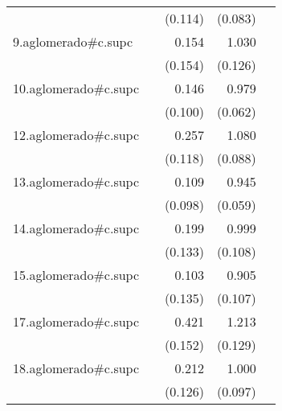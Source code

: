 {\begin{longtable}{l*{4}{D{.}{.}{-1}}}
            &                     &     (0.114)         &     (0.083)         &                     \\
\addlinespace
9.aglomerado#c.supc&                     &       0.154         &       1.030\sym{***}&                     \\
            &                     &     (0.154)         &     (0.126)         &                     \\
\addlinespace
10.aglomerado#c.supc&                     &       0.146         &       0.979\sym{***}&                     \\
            &                     &     (0.100)         &     (0.062)         &                     \\
\addlinespace
12.aglomerado#c.supc&                     &       0.257\sym{*}  &       1.080\sym{***}&                     \\
            &                     &     (0.118)         &     (0.088)         &                     \\
\addlinespace
13.aglomerado#c.supc&                     &       0.109         &       0.945\sym{***}&                     \\
            &                     &     (0.098)         &     (0.059)         &                     \\
\addlinespace
14.aglomerado#c.supc&                     &       0.199         &       0.999\sym{***}&                     \\
            &                     &     (0.133)         &     (0.108)         &                     \\
\addlinespace
15.aglomerado#c.supc&                     &       0.103         &       0.905\sym{***}&                     \\
            &                     &     (0.135)         &     (0.107)         &                     \\
\addlinespace
17.aglomerado#c.supc&                     &       0.421\sym{**} &       1.213\sym{***}&                     \\
            &                     &     (0.152)         &     (0.129)         &                     \\
\addlinespace
18.aglomerado#c.supc&                     &       0.212         &       1.000\sym{***}&                     \\
            &                     &     (0.126)         &     (0.097)         &                     \\

\end{longtable}}
